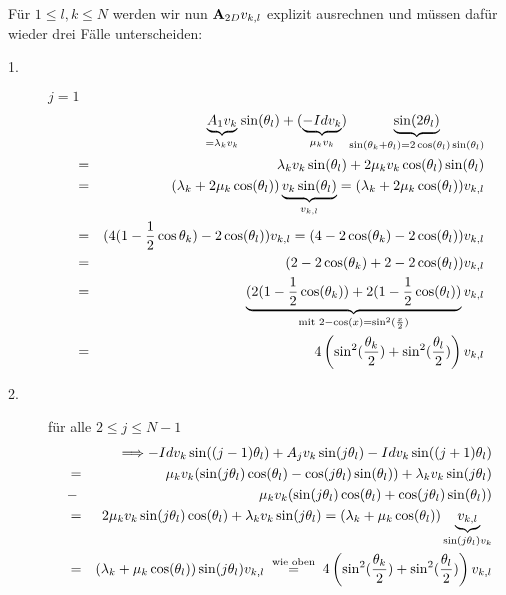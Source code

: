 Für $1 \le l,k \le N$ werden wir nun ${\textbf{A}}_{2D} v_{k,l}$ explizit ausrechnen und müssen dafür wieder drei Fälle unterscheiden:
\begin{description}
\item[1.] $j = 1$
\begin{eqnarray}
&&\underbrace{A_{1} v_{k}}_{=\lambda_{k} v_{k}} \sin(\theta_{l}) + (\underbrace{-Id v_{k}}_{\mu_{k} v_{k}}) \underbrace{\sin(2\theta_{l})}_{\sin(\theta_{k} + \theta_{l}) = 2\cos({\theta_{l})\sin({\theta_{l}})}} \notag \\
&=& \lambda_{k}v_{k}\sin(\theta_{l}) + 2\mu_{k}v_{k}\cos(\theta_{l})\sin(\theta_{l}) \notag \\
&=& (\lambda_{k} + 2\mu_{k}\cos(\theta_{l})) \underbrace{v_{k}\sin(\theta_{l})}_{v_{k,l}} = (\lambda_{k} + 2\mu_{k}\cos(\theta_{l}))v_{k,l} \notag \\
&=& (4(1 - \frac{1}{2}\cos{\theta_{k}}) - 2\cos(\theta_{l})) v_{k,l} = (4 - 2\cos(\theta_{k}) - 2\cos(\theta_{l})) v_{k,l} \notag \\
&=& (2 - 2\cos(\theta_{k}) + 2 - 2\cos(\theta_{l})) v_{k,l} \notag \\
&=& \underbrace{(2(1 - \frac{1}{2}\cos(\theta_{k})) + 2(1 - \frac{1}{2}\cos(\theta_{l}))}_{\textnormal{mit } 2 - \cos(x) = \sin^{2}(\frac{x}{2})} v_{k,l} \notag \\
&=& 4 \left(\sin^{2}(\frac {\theta_{k}} {2}) + \sin^{2}(\frac {\theta_{l}} {2})\right) v_{k,l}\notag
\end{eqnarray}
\item[2.] für alle $2 \le j \le N-1$
\begin{eqnarray}
&&\Longrightarrow -Id v_{k} \sin((j-1) \theta_{l}) + A_{j} v_{k} \sin(j\theta_{l}) - Id v_{k} \sin((j+1) \theta_{l}) \notag \\
&=& \mu_{k} v_{k} (\sin(j\theta_{l})\cos(\theta_{l}) - \cos(j\theta_{l})\sin(\theta_{l})) + \lambda_{k} v_{k} \sin(j\theta_{l}) \notag \\
&-& \mu_{k} v_{k} (\sin(j\theta_{l})\cos(\theta_{l}) + \cos(j\theta_{l})\sin(\theta_{l})) \notag \\
&=& 2 \mu_{k} v_{k} \sin(j\theta_{l})\cos(\theta_{l}) + \lambda_{k} v_{k} \sin(j\theta_{l}) = (\lambda_{k} + \mu_{k} \cos(\theta_{l})) \underbrace{v_{k,l}}_{\sin(j\theta_{l}) v_{k}} \notag \\
&=& (\lambda_{k} + \mu_{k} \cos(\theta_{l})) \sin(j\theta_{l}) v_{k,l} \overset{\textnormal{ wie oben }}{=} 4 \left(\sin^{2}(\frac {\theta_{k}} {2}) + \sin^{2}(\frac {\theta_{l}} {2})\right) v_{k,l} \notag
\end{eqnarray}

\end{description}
